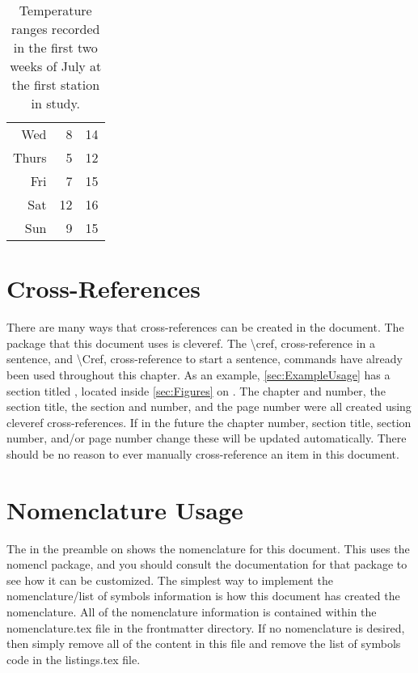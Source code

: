 \begin{table}
\begin{subtable}[h]{0.375\textwidth}
\begin{tabular}{r r r}
			Wed   & 8                             & 14   \\
			Thurs & 5                             & 12   \\
			Fri   & 7                             & 15   \\
			Sat   & 12                            & 16   \\
			Sun   & 9                             & 15   \\
			\hline
		\end{tabular}
	\end{subtable}
	\caption{Temperature ranges recorded in the first two weeks of July at the first station in study.}
	\label{tab:temps}
\end{table}

\section{Cross-References} \label{sec:CrossReferences}
There are many ways that cross-references can be created in the document.
The package that this document uses is cleveref.
The \textbackslash cref, cross-reference in a sentence, and \textbackslash Cref, cross-reference to start a sentence, commands have already been used throughout this chapter.
As an example, \cref{sec:ExampleUsage} has a section titled , located inside \cref{sec:Figures} on .
The chapter and number, the section title, the section and number, and the page number were all created using cleveref cross-references.
If in the future the chapter number, section title, section number, and/or page number change these will be updated automatically.
There should be no reason to ever manually cross-reference an item in this document.

\section{Nomenclature Usage} \label{sec:NomenclatureUsage}
The  in the preamble on  shows the nomenclature for this document.
This uses the nomencl package, and you should consult the documentation for that package to see how it can be customized.
The simplest way to implement the nomenclature/list of symbols information is how this document has created the nomenclature.
All of the nomenclature information is contained within the nomenclature.tex file in the frontmatter directory.
If no nomenclature is desired, then simply remove all of the content in this file and remove the list of symbols code in the listings.tex file.

